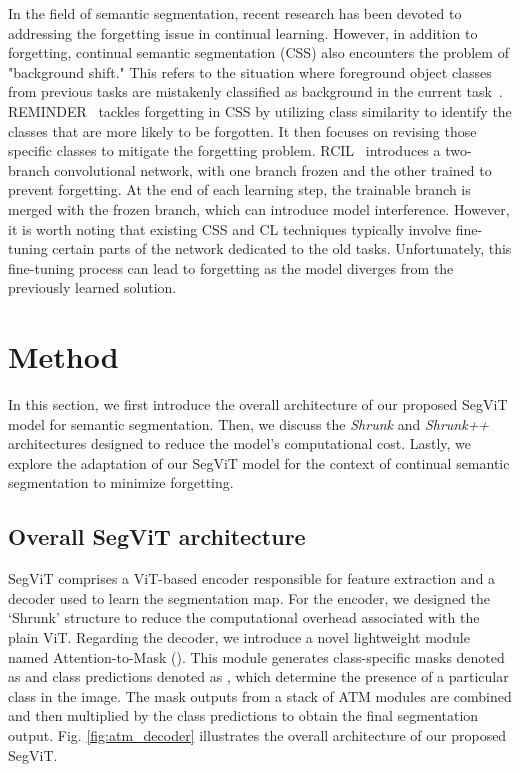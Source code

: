 In the field of semantic segmentation, recent research has been devoted to addressing the forgetting issue in continual learning. However, in addition to forgetting, continual semantic segmentation (CSS) also encounters the problem of "background shift." This refers to the situation where foreground object classes from previous tasks are mistakenly classified as background in the current task~\cite{cermelli2020ModelingTB}.
REMINDER~\cite{phan2022class} tackles forgetting in CSS by utilizing class similarity to identify the classes that are more likely to be forgotten. It then focuses on revising those specific classes to mitigate the forgetting problem. RCIL~\cite{zhang2022representation} introduces a two-branch convolutional network, with one branch frozen and the other trained to prevent forgetting. At the end of each learning step, the trainable branch is merged with the frozen branch, which can introduce model interference.
However, it is worth noting that existing CSS and CL techniques typically involve fine-tuning certain parts of the network dedicated to the old tasks. Unfortunately, this fine-tuning process can lead to forgetting as the model diverges from the previously learned solution. 

 

\section{Method}
 In this section, we first introduce the overall architecture of our proposed SegViT model for semantic segmentation. Then, we discuss the \emph{Shrunk} and \emph{Shrunk++} architectures designed to reduce the model's computational cost. Lastly, we explore the adaptation of our SegViT model for the context of continual semantic segmentation to minimize forgetting.

\subsection{Overall SegViT architecture}
SegViT comprises a ViT-based encoder responsible for feature extraction and a decoder used to learn the segmentation map. For the encoder, we designed the `Shrunk' structure to reduce the computational overhead associated with the plain ViT.
Regarding the decoder, we introduce a novel lightweight module named Attention-to-Mask (\atm). This module generates class-specific masks denoted as  and class predictions denoted as , which determine the presence of a particular class in the image. The mask outputs from a stack of ATM modules are combined and then multiplied by the class predictions to obtain the final segmentation output. Fig. \ref{fig:atm_decoder} illustrates the overall architecture of our proposed SegViT.


